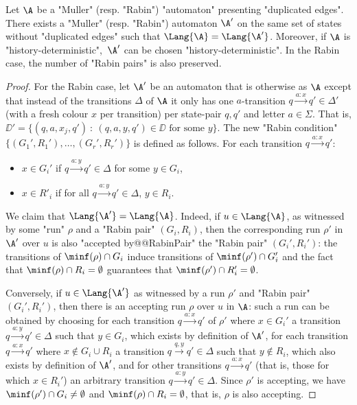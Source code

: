 \documentclass[10pt,a4paper]{amsart}
\begin{document}
\begin{proposition}\label{prop-app:simplification_Rabin}
	Let $\A$ be a "Muller" (resp. "Rabin") "automaton" presenting "duplicated edges". There exists a "Muller" (resp. "Rabin") automaton $\A'$ on the same set of states without "duplicated edges" such that $\Lang{\A} = \Lang{\A'}$. Moreover, if $\A$ is "history-deterministic",~$\A'$ can be chosen "history-deterministic". In the Rabin case, the number of "Rabin pairs" is also preserved. 
\end{proposition}
\begin{proof}
	For the Rabin case, let $\A'$ be an automaton that is otherwise as $\A$ except that instead of the transitions $\Delta$  of $\A$ it only has one $a$-transition $q \xrightarrow{a:x} q'\in \Delta'$ (with a fresh colour $x$ per transition) per state-pair $q,q'$ and letter $a\in \Sigma$. That is, $\DD'=\{(q,a,x_j,q') \: : \: (q,a,y,q')\in \DD \text{ for some } y\}$. The new "Rabin condition" $\{(G_1',R_1'),\ldots, (G_r',R_r')\}$ is defined as follows. For each transition $q\xrightarrow{a:x} q'$:
	\begin{itemize}
		\item $x\in G_i'$ if $q\xrightarrow{a:y} q'\in \Delta$ for some $y\in G_i$, %
		\item  $x\in R'_i$ if for all $q\xrightarrow{a:y} q'\in \Delta$,  $y\in R_i$. %
	\end{itemize}
	
	We claim that $\Lang{\A'}=\Lang{\A}$. Indeed, if $u\in \Lang{\A}$, as witnessed by some "run" $\rho$ and a "Rabin pair" $(G_i,R_i)$, then the corresponding run $\rho'$ in $\A'$ over $u$ is also "accepted by@@RabinPair" the "Rabin pair" $(G_i',R_i')$: the transitions of $\minf(\rho)\cap G_i$ induce transitions of $\minf(\rho')\cap G_i'$ and the fact that $\minf(\rho)\cap R_i=\emptyset$ guarantees that $\minf(\rho')\cap R_i'=\emptyset$.
	
	Conversely, if $u\in \Lang{\A'}$ as witnessed by a run $\rho'$ and "Rabin pair" $(G_i', R_i')$,
	then there is an accepting run $\rho$ over $u$ in $\A$: such a run can be obtained by choosing for each transition $q\xrightarrow{a:x}q'$ of $\rho'$ where $x\in G_i'$ a transition $q\xrightarrow{a:y}q'\in \Delta$ such that $y\in G_i$, which exists by definition of $\A'$, for each transition $q\xrightarrow{a:x}q'$ where $x\notin G_i\cup R_i$ a transition $q\xrightarrow{q,y}q'\in\Delta$ such that $y\notin R_i$, which also exists by definition of $\A'$, and for other transitions $q\xrightarrow{a:x}q'$ (that is, those for which $x\in R_i'$) an arbitrary transition $q\xrightarrow{a:y}q'\in \Delta$. Since $\rho'$ is accepting, we have $\minf(\rho')\cap G_i\neq \emptyset$ and $\minf(\rho)\cap R_i=\emptyset$, that is, $\rho$ is also accepting. 
	

\end{proof}
\end{document}

